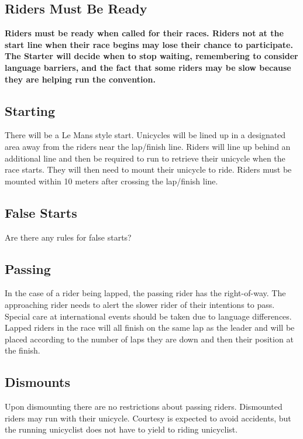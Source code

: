 \subsection{Riders Must Be Ready}

\textbf{Riders must be ready when called for their races.
Riders not at the start line when their race begins may lose their chance to participate.
The Starter will decide when to stop waiting, remembering to consider language barriers, and the fact that some riders may be slow because they are helping run the convention.}

\subsection{Starting}

There will be a Le Mans style start.
Unicycles will be lined up in a designated area away from the riders near the lap/finish line.
Riders will line up behind an additional line and then be required to run to retrieve their unicycle when the race starts.
They will then need to mount their unicycle to ride.
Riders must be mounted within 10 meters after crossing the lap/finish line.

\subsection{False Starts}

\begin{framed}
Are there any rules for false starts?
\end{framed}

\subsection{Passing}

In the case of a rider being lapped, the passing rider has the right-of-way.
The approaching rider needs to alert the slower rider of their intentions to pass.
Special care at international events should be taken due to language differences.
Lapped riders in the race will all finish on the same lap as the leader and will be placed according to the number of laps they are down and then their position at the finish.

\subsection{Dismounts}

Upon dismounting there are no restrictions about passing riders.
Dismounted riders may run with their unicycle.
Courtesy is expected to avoid accidents, but the running unicyclist does not have to yield to riding unicyclist.

